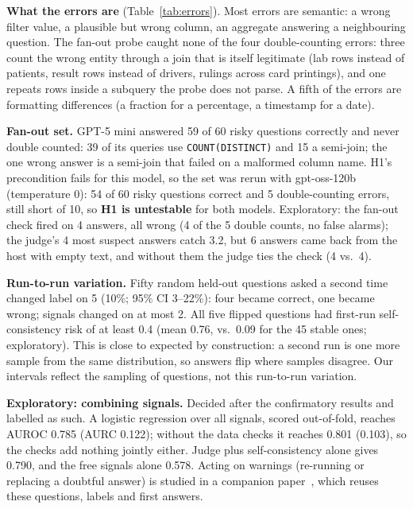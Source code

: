 \documentclass[conference]{IEEEtran}
\begin{document}
\textbf{What the errors are} (Table~\ref{tab:errors}). Most errors are semantic: a wrong filter
value, a plausible but wrong column, an aggregate answering a neighbouring question. The fan-out probe
caught none of the four double-counting errors: three count the wrong entity through a join that is
itself legitimate (lab rows instead of patients, result rows instead of drivers, rulings across card
printings), and one repeats rows inside a subquery the probe does not parse. A fifth of the errors are
formatting differences (a fraction for a percentage, a timestamp for a date).

\textbf{Fan-out set.} GPT-5 mini answered 59 of 60 risky questions correctly and never double
counted: 39 of its queries use \texttt{COUNT(DISTINCT)} and 15 a semi-join; the one wrong answer is a
semi-join that failed on a malformed column name. H1's precondition fails for this model, so the set
was rerun with gpt-oss-120b (temperature 0): 54 of 60 risky questions correct and 5 double-counting errors, still
short of 10, so \textbf{H1 is untestable} for both models. Exploratory: the fan-out check fired on 4
answers, all wrong (4 of the 5 double counts, no false alarms); the judge's 4 most suspect answers
catch 3.2, but 6 answers came back from the host with empty text, and without them the judge ties the
check (4 vs.\ 4).

\textbf{Run-to-run variation.} Fifty random held-out questions asked a second time changed label on 5
(10\%; 95\% CI 3--22\%): four became correct, one became wrong; signals changed on at most 2. All five
flipped questions had first-run self-consistency risk of at least 0.4 (mean 0.76, vs.\ 0.09 for the
45 stable ones; exploratory). This is close to expected by construction: a second run is one more
sample from the same distribution, so answers flip where samples disagree. Our intervals reflect the
sampling of questions, not this run-to-run variation.

\textbf{Exploratory: combining signals.} Decided after the confirmatory results and labelled as such.
A logistic regression over all signals, scored out-of-fold, reaches AUROC 0.785 (AURC 0.122); without
the data checks it reaches 0.801 (0.103), so the checks add nothing jointly either. Judge plus
self-consistency alone gives 0.790, and the free signals alone 0.578. Acting on warnings (re-running or
replacing a doubtful answer) is studied in a companion paper~\cite{companion2026decisions}, which reuses these
questions, labels and first answers.
\end{document}
